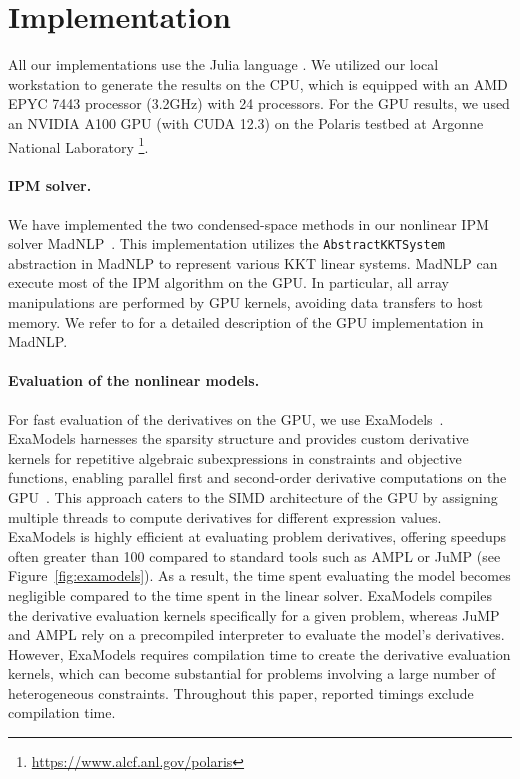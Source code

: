 \section{Implementation}
\label{sec:num:implementation}
All our implementations use the Julia language \cite{bezanson-edelman-karpinski-shah-2017}.
We utilized our local workstation to generate the results on the CPU, which is equipped with an AMD EPYC 7443 processor (3.2GHz) with 24 processors.
For the GPU results, we used an NVIDIA A100 GPU (with CUDA 12.3) on the Polaris testbed at Argonne National Laboratory
\footnote{\url{https://www.alcf.anl.gov/polaris}}.


\paragraph{IPM solver.}
We have implemented the two condensed-space methods in our nonlinear IPM solver MadNLP~\cite{shin2021graph}.
This implementation utilizes the {\tt AbstractKKTSystem} abstraction
in MadNLP to represent various KKT linear systems.
MadNLP can execute most of the IPM algorithm on the GPU.
In particular, all array manipulations are performed by GPU kernels, avoiding data transfers to host memory.
We refer to \cite{shin2023accelerating} for a detailed description of the GPU implementation in MadNLP.


\paragraph{Evaluation of the nonlinear models.}
For fast evaluation of the derivatives on the GPU,
we use ExaModels~\cite{shin2023accelerating}.
ExaModels harnesses the sparsity structure and provides custom derivative
kernels for repetitive algebraic subexpressions in constraints and
objective functions, enabling parallel first and second-order derivative computations on the GPU~\cite{bischof1991exploiting,enzyme2021}.
This approach caters to the SIMD architecture of the GPU by assigning multiple threads
to compute derivatives for different expression values.
ExaModels is highly efficient at evaluating problem derivatives, offering speedups often greater than 100 compared
to standard tools such as AMPL or JuMP (see Figure~\ref{fig:examodels}). As a
result, the time spent evaluating the model becomes
negligible compared to the time spent in the linear solver.
ExaModels compiles the derivative evaluation kernels specifically for a
given problem, whereas JuMP and AMPL rely on a precompiled interpreter to evaluate the model's derivatives.
However, ExaModels requires compilation time to create the derivative
evaluation kernels, which can become substantial for problems involving a
large number of heterogeneous constraints.
Throughout this paper, reported timings exclude compilation time.

